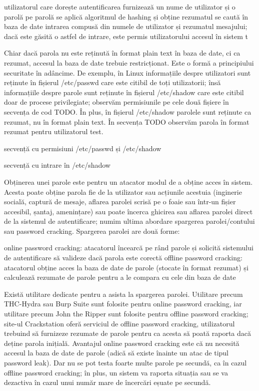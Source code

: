 utilizatorul care dorește autentificarea furnizează un nume de utilizator și o parolă
pe parolă se aplică algoritmul de hashing și obține rezumatul
se caută în baza de date intrarea compusă din numele de utilizator și rezumatul mesajului; dacă este găsită o astfel de intrare, este permis utilizatorului accesul în sistem
t

Chiar dacă parola nu este reținută în format plain text în baza de date, ci ca rezumat, accesul la baza de date trebuie restricționat. Este o formă a principiului securitate în adâncime. De exemplu, în Linux informațiile despre utilizatori sunt reținute în fișierul /etc/passwd care este citibil de toți utilizatorii; însă informațiile despre parole sunt reținute în fișierul /etc/shadow care este citibil doar de procese privilegiate; observăm permisiunile pe cele două fișiere în secvența de cod TODO. În plus, în fișierul /etc/shadow parolele sunt reținute ca rezumat, nu în format plain text. În secvența TODO observăm parola în format rezumat pentru utilizatorul test.

secvență cu permisiuni /etc/passwd și /etc/shadow

secvență cu intrare în /etc/shadow

Obținerea unei parole este pentru un atacator modul de a obține acces în sistem. Acesta poate obține parola fie de la utilizator sau acțiunile acestuia (inginerie socială, captură de mesaje, aflarea parolei scrisă pe o foaie sau într-un fișier accesibil, șantaj, amenințare) sau poate încerca ghicirea sau aflarea parolei direct de la sistemul de autentificare; numim ultima abordare spargerea parolei/contului sau password cracking. Spargerea parolei are două forme:

online password cracking: atacatorul încearcă pe rând parole și solicită sistemului de autentificare să valideze dacă parola este corectă
offline password cracking: atacatorul obține acces la baza de date de parole (stocate în format rezumat) și calculează rezumate de parole pentru a le compara cu cele din baza de date

Există utilitare dedicate pentru a asista la spargerea parolei. Utilitare precum THC-Hydra sau Burp Suite sunt folosite pentru online password cracking, iar utilitare precum John the Ripper sunt folosite pentru offline password cracking; site-ul Crackstation oferă serviciul de offline password cracking, utilizatorul trebuind să furnizeze rezumate de parole pentru ca acesta să poată raporta dacă deține parola inițială. Avantajul online password cracking este că nu necesită accesul la baza de date de parole (adică să existe înainte un atac de tipul password leak). Dar nu se pot testa foarte multe parole pe secundă, ca în cazul offline password cracking; în plus, un sistem va raporta situația sau se va dezactiva în cazul unui număr mare de încercări eșuate pe secundă.

